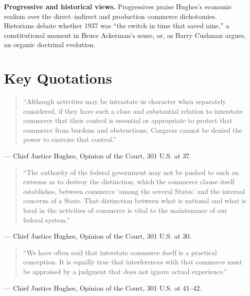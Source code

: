 \documentclass[12pt]{article}
\begin{document}
\textbf{Progressive and historical views.} Progressives praise Hughes's economic realism over the direct--indirect and production--commerce dichotomies. Historians debate whether 1937 was ``the switch in time that saved nine,'' a constitutional moment in Bruce Ackerman's sense, or, as Barry Cushman argues, an organic doctrinal evolution.

\section{Key Quotations}

\begin{quote}
``Although activities may be intrastate in character when separately considered, if they have such a close and substantial relation to interstate commerce that their control is essential or appropriate to protect that commerce from burdens and obstructions, Congress cannot be denied the power to exercise that control.''
\end{quote}
\noindent --- Chief Justice Hughes, Opinion of the Court, 301 U.S. at 37.

\begin{quote}
``The authority of the federal government may not be pushed to such an extreme as to destroy the distinction, which the commerce clause itself establishes, between commerce `among the several States' and the internal concerns of a State. That distinction between what is national and what is local in the activities of commerce is vital to the maintenance of our federal system.''
\end{quote}
\noindent --- Chief Justice Hughes, Opinion of the Court, 301 U.S. at 30.

\begin{quote}
``We have often said that interstate commerce itself is a practical conception. It is equally true that interferences with that commerce must be appraised by a judgment that does not ignore actual experience.''
\end{quote}
\noindent --- Chief Justice Hughes, Opinion of the Court, 301 U.S. at 41--42.
\end{document}
